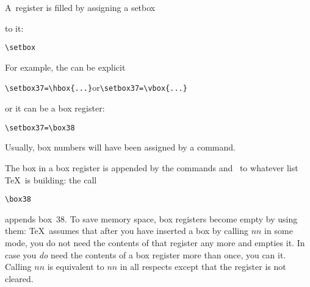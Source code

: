 \documentclass{book}
\begin{document}
A~register is filled by assigning a 
\cstoidx setbox\par
to it:
\begin{Disp}\verb>\setbox>\end{Disp}
For example, the  can be explicit
\begin{Disp}\verb>\setbox37=\hbox{...}>\quad or\quad \verb>\setbox37=\vbox{...}>
\end{Disp}
or it can be a box register:
\begin{verbatim}
\setbox37=\box38
\end{verbatim}
Usually, box numbers will have been assigned by a 
command.

The box in a box register is appended
by the commands  and~
to whatever list \TeX\ is building: the call
\begin{verbatim}
\box38
\end{verbatim}
appends box~38.
To save memory space, box registers become empty by using them:
\TeX\ assumes that after you have inserted a box by
calling $nn$ in some mode, you do not need the
contents of that register any more and empties it.
In case you {\em do\/} need the contents of
a box register more than once,
you can  it. Calling $nn$ is
equivalent to $nn$ in all respects except that
the register is not cleared.
\end{document}
